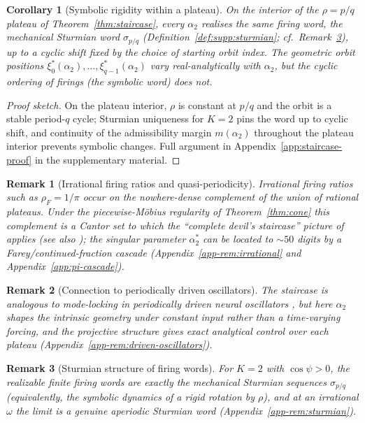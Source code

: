 \documentclass[12pt]{article}
\newtheorem{corollary}{Corollary}
\newtheorem{remark}{Remark}
\begin{document}
\begin{corollary}[Symbolic rigidity within a plateau]\label{cor:within-plateau}
On the interior of the $\rho=p/q$ plateau of Theorem~\ref{thm:staircase}, every $\alpha_2$ realises the \emph{same} firing word, the mechanical Sturmian word $\sigma_{p/q}$ (Definition~\ref{def:supp:sturmian}; cf.\ Remark~\ref{rem:sturmian}), up to a cyclic shift fixed by the choice of starting orbit index. The geometric orbit positions $\xi_0^*(\alpha_2),\ldots,\xi_{q-1}^*(\alpha_2)$ vary real-analytically with $\alpha_2$, but the cyclic ordering of firings (the symbolic word) does not.
\end{corollary}

\begin{proof}[Proof sketch] On the plateau interior, $\rho$ is constant at $p/q$ and the orbit is a stable period-$q$ cycle; Sturmian uniqueness for $K=2$ \citep{coven1973sequences,lothaire2002algebraic} pins the word up to cyclic shift, and continuity of the admissibility margin $m(\alpha_2)$ throughout the plateau interior prevents symbolic changes. Full argument in Appendix~\ref{app:staircase-proof} in the supplementary material.\end{proof}

\begin{remark}[Irrational firing ratios and quasi-periodicity]\label{rem:irrational} Irrational firing ratios such as $\rho_F=1/\pi$ occur on the nowhere-dense complement of the union of rational plateaus. Under the piecewise-M\"obius regularity of Theorem~\ref{thm:cone} this complement is a Cantor set to which the ``complete devil's staircase'' picture of \citet{jensen1983complete} applies (see also \citealp{herman1979conjugaison}); the singular parameter $\alpha_2^*$ can be located to ${\sim}50$ digits by a Farey/continued-fraction cascade (Appendix~\ref{app-rem:irrational} and Appendix~\ref{app:pi-cascade}). \end{remark}

\begin{remark}[Connection to periodically driven oscillators]\label{rem:driven-oscillators} The staircase is analogous to mode-locking in periodically driven neural oscillators \citep{glass1988clocks}, but here $\alpha_2$ shapes the intrinsic geometry under constant input rather than a time-varying forcing, and the projective structure gives exact analytical control over each plateau (Appendix~\ref{app-rem:driven-oscillators}). \end{remark}

\begin{remark}[Sturmian structure of firing words]\label{rem:sturmian} For $K=2$ with $\cos\psi>0$, the realizable finite firing words are exactly the mechanical Sturmian sequences $\sigma_{p/q}$ (equivalently, the symbolic dynamics of a rigid rotation by $\rho$), and at an irrational $\omega$ the limit is a genuine aperiodic Sturmian word (Appendix~\ref{app-rem:sturmian}). \end{remark}
\end{document}
